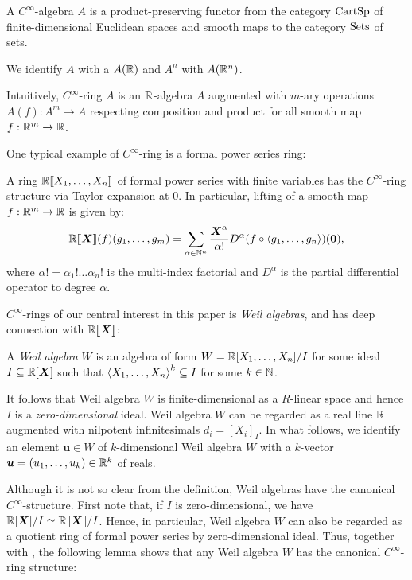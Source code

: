 \documentclass[%
  sigconf,authorversion,screen]{acmart}
\begin{document}
\begin{definition}
  A \emph{$C^\infty$}-algebra $A$ is a product-preserving functor from the category $\mathord{\mathrm{CartSp}}$ of finite-dimensional Euclidean spaces and smooth maps to the category $\mathord{\mathrm{Sets}}$ of sets.

  We identify $A$ with a $A(\mathbb{R})$ and $A^n$ with $A(\mathbb{R}^n)$.
\end{definition}

Intuitively, $C^\infty$-ring $A$ is an $\mathbb{R}$-algebra $A$ augmented with $m$-ary operations $A(f): A^m \to A$ respecting composition and product for all smooth map $f: \mathbb{R}^m \to \mathbb{R}$.

One typical example of $C^\infty$-ring is a formal power series ring:

\begin{theorem}[Lawvere]\label{thm:series-is-smooth}
  A ring $\mathbb{R}\llbracket X_1, \dots, X_n\rrbracket$ of formal power series with finite variables has the $C^\infty$-ring structure via Taylor expansion at $0$.
  In particular, lifting of a smooth map $f: \mathbb{R}^m \to \mathbb{R}$ is given by:
  \[
    \mathord{\mathbb{R}\llbracket\boldsymbol{X}\rrbracket}(f)(g_1, \dots, g_m) = \sum_{\alpha \in \mathbb{N}^n} \frac{\boldsymbol{X}^\alpha}{\alpha!} D^\alpha(f \circ \braket{g_1, \dots, g_n})(\boldsymbol{0}),
  \]
  where $\alpha! = \alpha_1 ! \dots \alpha_n !$ is the multi-index factorial and $D^\alpha$ is the partial differential operator to degree $\alpha$.
\end{theorem}

$C^\infty$-rings of our central interest in this paper is \emph{Weil algebras}, and has deep connection with $\mathord{\mathbb{R}\llbracket\boldsymbol{X}\rrbracket}$:

\begin{definition}
  A \emph{Weil algebra} $W$ is an algebra of form $W = \mathbb{R}[X_1, \dots, X_n]/I$ for some ideal $I \subseteq \mathbb{R}[\boldsymbol{X}]$ such that $\braket{X_1, \dots, X_n}^k \subseteq I$ for some $k \in \mathbb{N}$.
\end{definition}
It follows that Weil algebra $W$ is finite-dimensional as a $R$-linear space and hence $I$ is a \emph{zero-dimensional} ideal.
Weil algebra $W$ can be regarded as a real line $\mathbb{R}$ augmented with nilpotent infinitesimals $d_i = {[X_i]}_I$.
In what follows, we identify an element $\boldsymbol{u} \in W$ of $k$-dimensional Weil algebra $W$ with a $k$-vector $\boldsymbol{u} = (u_1, \dots, u_k) \in \mathbb{R}^k$ of reals.

Although it is not so clear from the definition, Weil algebras have the canonical $C^\infty$-structure.
First note that, if $I$ is zero-dimensional, we have $\mathbb{R}[\boldsymbol{X}]/I \simeq \mathbb{R}\llbracket \boldsymbol{X} \rrbracket /I$.
Hence, in particular, Weil algebra $W$ can also be regarded as a quotient ring of formal power series by zero-dimensional ideal.
Thus, together with , the following lemma shows that any Weil algebra $W$ has the canonical $C^\infty$-ring structure:
\end{document}
